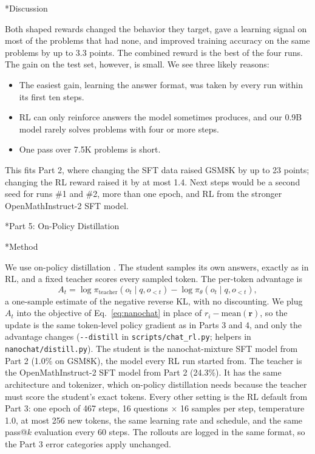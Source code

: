 \documentclass[11pt]{article}
\makeatletter
\renewcommand\section{\@startsection{section}{1}{\z@}{1.2em}{0.5em}{\large\bfseries}}
\renewcommand\subsection{\@startsection{subsection}{2}{\z@}{0.6em}{0.2em}{\normalsize\bfseries}}
\newcommand{\code}[1]{\texttt{#1}}
\makeatother
\begin{document}
\subsection*{Discussion}

Both shaped rewards changed the behavior they target, gave a learning signal on most of the problems that had none, and improved training accuracy on the same problems by up to 3.3 points. The combined reward is the best of the four runs. The gain on the test set, however, is small. We see three likely reasons:
\begin{itemize}[nosep]
  \item The easiest gain, learning the answer format, was taken by every run within its first ten steps.
  \item RL can only reinforce answers the model sometimes produces, and our 0.9B model rarely solves problems with four or more steps.
  \item One pass over 7.5K problems is short.
\end{itemize}
This fits Part 2, where changing the SFT data raised GSM8K by up to 23 points; changing the RL reward raised it by at most 1.4. Next steps would be a second seed for runs \#1 and \#2, more than one epoch, and RL from the stronger OpenMathInstruct-2 SFT model.

\section*{Part 5: On-Policy Distillation}

\subsection*{Method}

We use on-policy distillation \cite{opd}. The student samples its own answers, exactly as in RL, and a fixed teacher scores every sampled token. The per-token advantage is
\begin{equation}
A_t = \log\pi_{\text{teacher}}(o_t\mid q,o_{<t}) - \log\pi_\theta(o_t\mid q,o_{<t}),
\label{eq:opd}
\end{equation}
a one-sample estimate of the negative reverse KL, with no discounting. We plug $A_t$ into the objective of Eq.~\ref{eq:nanochat} in place of $r_i-\text{mean}(\mathbf{r})$, so the update is the same token-level policy gradient as in Parts 3 and 4, and only the advantage changes (\code{-{}-distill} in \code{scripts/chat\_rl.py}; helpers in \code{nanochat/distill.py}). The student is the nanochat-mixture SFT model from Part 2 (1.0\% on GSM8K), the model every RL run started from. The teacher is the OpenMathInstruct-2 SFT model from Part 2 (24.3\%). It has the same architecture and tokenizer, which on-policy distillation needs because the teacher must score the student's exact tokens. Every other setting is the RL default from Part 3: one epoch of 467 steps, 16 questions $\times$ 16 samples per step, temperature 1.0, at most 256 new tokens, the same learning rate and schedule, and the same pass@$k$ evaluation every 60 steps. The rollouts are logged in the same format, so the Part 3 error categories apply unchanged.
\end{document}
